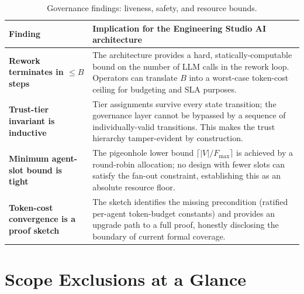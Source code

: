 \documentclass[12pt]{article}
\theoremstyle{definition}
\begin{document}
\begin{table}[H]
\centering
\caption{Governance findings: liveness, safety, and resource bounds.}
\label{tab:findings-governance}
\begin{tabularx}{\linewidth}{@{}>{\bfseries\RaggedRight}p{3.6cm} X@{}}
\toprule
Finding & Implication for the Engineering Studio AI architecture \\
\midrule
Rework terminates in $\le B$ steps &
  The architecture provides a hard, statically-computable bound on the
  number of LLM calls in the rework loop.  Operators can translate $B$
  into a worst-case token-cost ceiling for budgeting and SLA purposes. \\[4pt]
Trust-tier invariant is inductive &
  Tier assignments survive every state transition; the governance
  layer cannot be bypassed by a sequence of individually-valid
  transitions.  This makes the trust hierarchy tamper-evident by
  construction. \\[4pt]
Minimum agent-slot bound is tight &
  The pigeonhole lower bound $\lceil|V|/F_{\max}\rceil$ is achieved
  by a round-robin allocation; no design with fewer slots can
  satisfy the fan-out constraint, establishing this as an absolute
  resource floor. \\[4pt]
Token-cost convergence is a proof sketch &
  The sketch identifies the missing precondition (ratified per-agent
  token-budget constants) and provides an upgrade path to a full
  proof, honestly disclosing the boundary of current formal coverage. \\
\bottomrule
\end{tabularx}
\end{table}

\section{Scope Exclusions at a Glance}
\label{app:exclusions}
\end{document}
